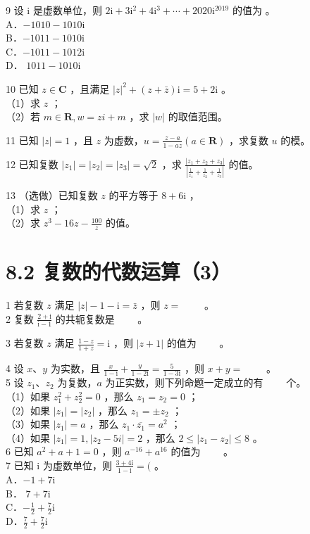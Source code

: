 \documentclass[10pt]{article}
\begin{document}
9 设 i 是虚数单位，则 \(2 \mathrm{i}+3 \mathrm{i}^{2}+4 \mathrm{i}^{3}+\cdots+2020 \mathrm{i}^{2019}\) 的值为 。\\
A．\(-1010-1010 \mathrm{i}\)\\
B．\(-1011-1010 \mathrm{i}\)\\
C．\(-1011-1012 \mathrm{i}\)\\
D． \(1011-1010 \mathrm{i}\)

10 已知 \(z \in \mathbf{C}\) ，且满足 \(|z|^{2}+(z+\bar{z}) \mathrm{i}=5+2 \mathrm{i}\) 。\\
（1）求 \(z\) ；\\
（2）若 \(m \in \mathbf{R}, w=z i+m\) ，求 \(|w|\) 的取值范围。

11 已知 \(|z|=1\) ，且 \(z\) 为虚数，\(u=\frac{z-a}{1-a z}(a \in \mathbf{R})\) ，求复数 \(u\) 的模。

12 已知复数 \(\left|z_{1}\right|=\left|z_{2}\right|=\left|z_{3}\right|=\sqrt{2}\) ，求 \(\frac{\left|z_{1}+z_{2}+z_{3}\right|}{\left|\frac{1}{z_{1}}+\frac{1}{z_{2}}+\frac{1}{z_{3}}\right|}\) 的值。

13 （选做）已知复数 \(z\) 的平方等于 \(8+6 \mathrm{i}\) ，\\
（1）求 \(z\) ；\\
（2）求 \(z^{3}-16 z-\frac{100}{z}\) 的值。

\section*{8.2 复数的代数运算（3）}
1 若复数 \(z\) 满足 \(|z|-1-\mathrm{i}=\bar{z}\) ，则 \(z=\) \(\qquad\)。\\
2 复数 \(\frac{2+\mathrm{i}}{\mathrm{i}-1}\) 的共轭复数是 \(\qquad\)。

3 若复数 \(z\) 满足 \(\frac{1-z}{1+z}=\mathrm{i}\) ，则 \(|z+1|\) 的值为 \(\qquad\)。

4 设 \(x 、 y\) 为实数，且 \(\frac{x}{1-\mathrm{i}}+\frac{y}{1-2 \mathrm{i}}=\frac{5}{1-3 \mathrm{i}}\) ，则 \(x+y=\) \(\qquad\)。\\
5 设 \(z_{1} 、 z_{2}\) 为复数，\(a\) 为正实数，则下列命题一定成立的有 \(\qquad\)个。\\
（1）如果 \(z_{1}^{2}+z_{2}^{2}=0\) ，那么 \(z_{1}=z_{2}=0\) ；\\
（2）如果 \(\left|z_{1}\right|=\left|z_{2}\right|\) ，那么 \(z_{1}= \pm z_{2}\) ；\\
（3）如果 \(\left|z_{1}\right|=a\) ，那么 \(z_{1} \cdot \overline{z_{1}}=a^{2}\) ；\\
（4）如果 \(\left|z_{1}\right|=1,\left|z_{2}-5 i\right|=2\) ，那么 \(2 \leqslant\left|z_{1}-z_{2}\right| \leqslant 8\) 。\\
6 已知 \(a^{2}+a+1=0\) ，则 \(a^{-16}+a^{16}\) 的值为 \(\qquad\)。\\
7 已知 i 为虚数单位，则 \(\frac{3+4 \mathrm{i}}{1-\mathrm{i}}=(\) 。\\
A．\(-1+7 \mathrm{i}\)\\
B． \(7+7 \mathrm{i}\)\\
C．\(-\frac{1}{2}+\frac{7}{2} \mathrm{i}\)\\
D．\(\frac{7}{2}+\frac{7}{2} \mathrm{i}\)
\end{document}
